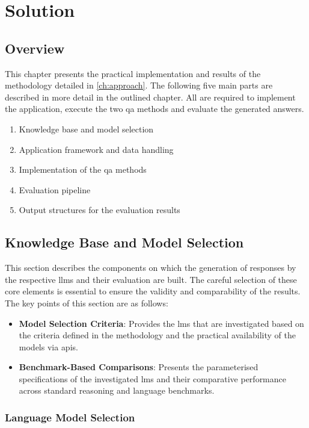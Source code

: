 \chapter{Solution}\label{ch:solution}
\section{Overview}
This chapter presents the practical implementation and results of the methodology detailed in \cref{ch:approach}.
The following five main parts are described in more detail in the outlined chapter. All are required to implement the application, execute the two \ac{qa} methods and evaluate the generated answers.
\begin{enumerate}
  \item Knowledge base and model selection
  \item Application framework and data handling
  \item Implementation of the \ac{qa} methods
  \item Evaluation pipeline
  \item Output structures for the evaluation results
\end{enumerate}
%
\section{Knowledge Base and Model Selection}

This section describes the components on which the generation of responses by the respective \acp{llm} and their evaluation are built.
The careful selection of these core elements is essential to ensure the validity and comparability of the results.
The key points of this section are as follows:
\begin{itemize}
    \item \textbf{Model Selection Criteria}: Provides the \acp{lm} that are investigated based on the criteria defined in the methodology and the practical availability of the models via \acp{api}.
    \item \textbf{Benchmark-Based Comparisons}: Presents the parameterised specifications of the investigated \acp{lm} and their comparative performance across standard reasoning and language benchmarks.
\end{itemize}
\subsection{Language Model Selection}\label{sub:model_select_crit}

